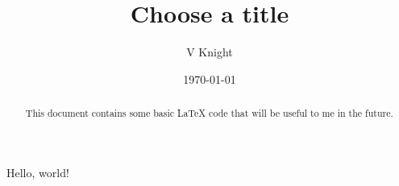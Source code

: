 \documentclass{article} %
\title{Choose a title}
\author{V Knight}
\date{\today}
\begin{document}

\begin{abstract}
This document contains some basic LaTeX code that will be useful to me in the future.
\end{abstract}


\maketitle

Hello, world!
\end{document}
